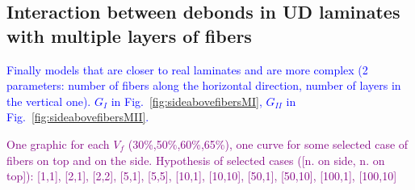 \documentclass[review]{elsarticle}
\begin{document}
\subsection{Interaction between debonds in UD laminates with multiple layers of fibers}

\textcolor{blue}{Finally models that are closer to real laminates and are more complex (2 parameters: number of fibers along the horizontal direction, number of layers in the vertical one).  $G_{I}$ in Fig.~\ref{fig:sideabovefibersMI}, $G_{II}$ in Fig.~\ref{fig:sideabovefibersMII}.}

\textcolor{purple}{One graphic for each $V_{f}$ (30\%,50\%,60\%,65\%), one curve for some selected case of fibers on top and on the side. Hypothesis of selected cases ([n. on side, n. on top]): [1,1], [2,1], [2,2], [5,1], [5,5], [10,1], [10,10], [50,1],  [50,10], [100,1], [100,10]}\\
\end{document}
